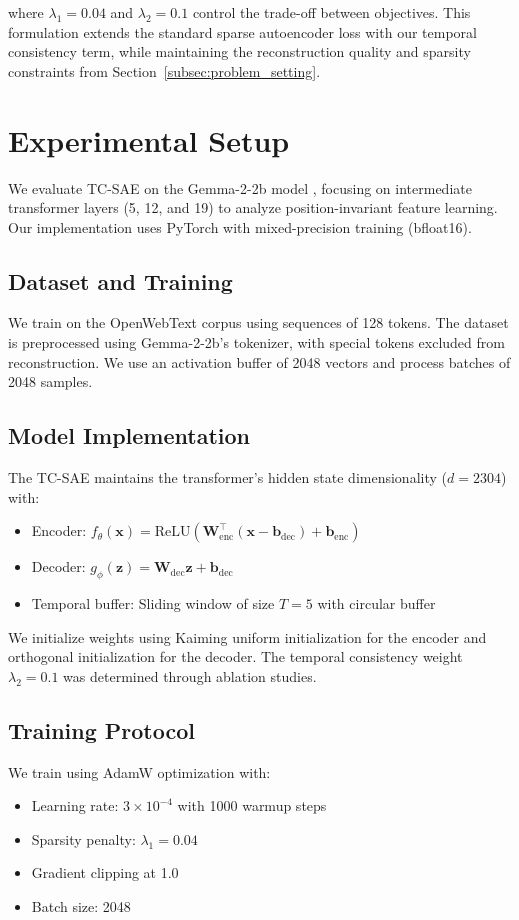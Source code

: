 \documentclass{article} %
\begin{document}
where $\lambda_1=0.04$ and $\lambda_2=0.1$ control the trade-off between objectives. This formulation extends the standard sparse autoencoder loss with our temporal consistency term, while maintaining the reconstruction quality and sparsity constraints from Section~\ref{subsec:problem_setting}.


\section{Experimental Setup}
\label{sec:experimental}

We evaluate TC-SAE on the Gemma-2-2b model \cite{radford2019language}, focusing on intermediate transformer layers (5, 12, and 19) to analyze position-invariant feature learning. Our implementation uses PyTorch \cite{paszke2019pytorch} with mixed-precision training (bfloat16).

\subsection{Dataset and Training}
We train on the OpenWebText corpus \cite{karpathy2023nanogpt} using sequences of 128 tokens. The dataset is preprocessed using Gemma-2-2b's tokenizer, with special tokens excluded from reconstruction. We use an activation buffer of 2048 vectors and process batches of 2048 samples.

\subsection{Model Implementation}
The TC-SAE maintains the transformer's hidden state dimensionality ($d=2304$) with:
\begin{itemize}
    \item Encoder: $f_\theta(\mathbf{x}) = \text{ReLU}(\mathbf{W}_{\text{enc}}^\top (\mathbf{x} - \mathbf{b}_{\text{dec}}) + \mathbf{b}_{\text{enc}})$
    \item Decoder: $g_\phi(\mathbf{z}) = \mathbf{W}_{\text{dec}} \mathbf{z} + \mathbf{b}_{\text{dec}}$
    \item Temporal buffer: Sliding window of size $T=5$ with circular buffer
\end{itemize}

We initialize weights using Kaiming uniform initialization for the encoder and orthogonal initialization for the decoder. The temporal consistency weight $\lambda_2=0.1$ was determined through ablation studies.

\subsection{Training Protocol}
We train using AdamW optimization \cite{loshchilov2017adamw} with:
\begin{itemize}
    \item Learning rate: $3 \times 10^{-4}$ with 1000 warmup steps
    \item Sparsity penalty: $\lambda_1 = 0.04$
    \item Gradient clipping at 1.0
    \item Batch size: 2048
\end{itemize}
\end{document}

